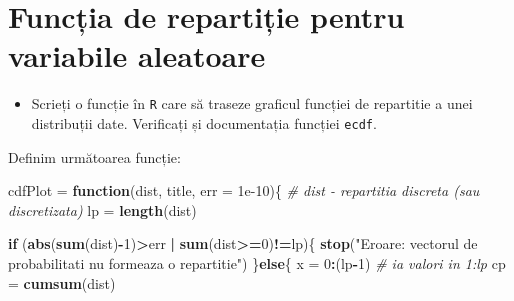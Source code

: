 \documentclass[]{article}
\newenvironment{Shaded}{\begin{snugshade}}{\end{snugshade}}
\newcommand{\KeywordTok}[1]{\textcolor[rgb]{0.13,0.29,0.53}{\textbf{#1}}}
\newcommand{\DataTypeTok}[1]{\textcolor[rgb]{0.13,0.29,0.53}{#1}}
\newcommand{\DecValTok}[1]{\textcolor[rgb]{0.00,0.00,0.81}{#1}}
\newcommand{\FloatTok}[1]{\textcolor[rgb]{0.00,0.00,0.81}{#1}}
\newcommand{\StringTok}[1]{\textcolor[rgb]{0.31,0.60,0.02}{#1}}
\newcommand{\CommentTok}[1]{\textcolor[rgb]{0.56,0.35,0.01}{\textit{#1}}}
\newcommand{\ControlFlowTok}[1]{\textcolor[rgb]{0.13,0.29,0.53}{\textbf{#1}}}
\newcommand{\OperatorTok}[1]{\textcolor[rgb]{0.81,0.36,0.00}{\textbf{#1}}}
\newcommand{\NormalTok}[1]{#1}
\newenvironment{frshaded*}{%
  \def\FrameCommand{\fboxrule=\FrameRule\fboxsep=\FrameSep \fcolorbox{framecolor}{shadecolor1}}%
  \MakeFramed {\advance\hsize-\width \FrameRestore}}%
{\endMakeFramed}
\newenvironment{rmdblock}[1]
  {\begin{frshaded*}
  \begin{itemize}
  \renewcommand{\labelitemi}{
    \raisebox{-.7\height}[0pt][0pt]{
      {\setkeys{Gin}{width=2em,keepaspectratio}\texttt{[image: images/icons/\#1]}}
    }
  }
  \item
  }
  {
  \end{itemize}
  \end{frshaded*}
  }
\newenvironment{rmdexercise}
  {\begin{rmdblock}{exercise}}
  {\end{rmdblock}}
\begin{document}
\section{Funcția de repartiție pentru variabile
aleatoare}\label{functia-de-repartitie-pentru-variabile-aleatoare}

\begin{rmdexercise}
Scrieți o funcție în \texttt{R} care să traseze graficul funcției de
repartitie a unei distribuții date. Verificați și documentația funcției
\texttt{ecdf}.
\end{rmdexercise}

Definim următoarea funcție:

\begin{Shaded}
\begin{Highlighting}[]
\NormalTok{cdfPlot =}\StringTok{ }\ControlFlowTok{function}\NormalTok{(dist, title, }\DataTypeTok{err =} \FloatTok{1e-10}\NormalTok{)\{}
  \CommentTok{# dist - repartitia discreta (sau discretizata)}
\NormalTok{  lp =}\StringTok{ }\KeywordTok{length}\NormalTok{(dist)}
  
  \ControlFlowTok{if}\NormalTok{ (}\KeywordTok{abs}\NormalTok{(}\KeywordTok{sum}\NormalTok{(dist)}\OperatorTok{-}\DecValTok{1}\NormalTok{)}\OperatorTok{>}\NormalTok{err }\OperatorTok{|}\StringTok{ }\KeywordTok{sum}\NormalTok{(dist}\OperatorTok{>=}\DecValTok{0}\NormalTok{)}\OperatorTok{!=}\NormalTok{lp)\{}
    \KeywordTok{stop}\NormalTok{(}\StringTok{"Eroare: vectorul de probabilitati nu formeaza o repartitie"}\NormalTok{)}
\NormalTok{  \}}\ControlFlowTok{else}\NormalTok{\{}
\NormalTok{    x =}\StringTok{ }\DecValTok{0}\OperatorTok{:}\NormalTok{(lp}\OperatorTok{-}\DecValTok{1}\NormalTok{) }\CommentTok{# ia valori in 1:lp}
\NormalTok{    cp =}\StringTok{ }\KeywordTok{cumsum}\NormalTok{(dist)}
    

\end{Highlighting}
\end{Shaded}
\end{document}
